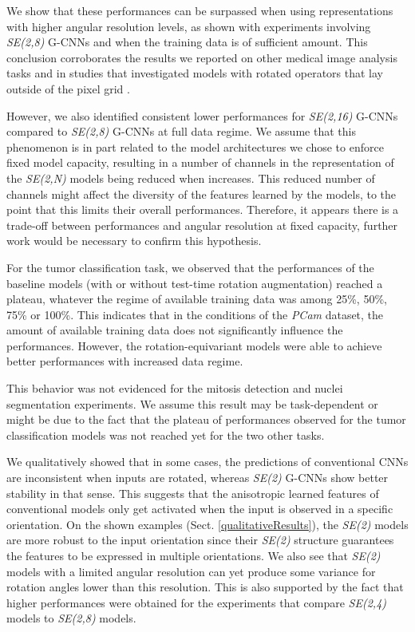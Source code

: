 \documentclass[twocolumn,final]{article}
\newcommand{\se}[1]{\textit{SE(#1)}}
\begin{document}
We show that these performances can be surpassed when using representations with higher angular resolution levels, as shown with experiments involving \se{2,8} G-CNNs and when the training data is of sufficient amount. This conclusion corroborates the results we reported on other medical image analysis tasks \citep{bekkers2018roto} and in studies that investigated models with rotated operators that lay outside of the pixel grid \citep{hoogeboom2018hexaconv}.

However, we also identified consistent lower performances for \se{2,16} G-CNNs compared to \se{2,8} G-CNNs at full data regime.
We assume that this phenomenon is in part related to the model architectures we chose to enforce fixed model capacity, resulting in a number of channels in the representation of the \se{2,N} models being reduced when  increases. This reduced number of channels might affect the diversity of the features learned by the models, to the point that this limits their overall performances.
Therefore, it appears there is a trade-off between performances and angular resolution at fixed capacity, further work would be necessary to confirm this hypothesis.

For the tumor classification task, we observed that the performances of the baseline models (with or without test-time rotation augmentation) reached a plateau, whatever the regime of available training data was among 25\%, 50\%, 75\% or 100\%.
This indicates that in the conditions of the \textit{PCam} dataset, the amount of available training data does not significantly influence the performances.
However, the rotation-equivariant models were able to achieve better performances with increased data regime.

This behavior was not evidenced for the mitosis detection and nuclei segmentation experiments.
We assume this result may be task-dependent or might be due to the fact that the plateau of performances observed for the tumor classification models was not reached yet for the two other tasks.

We qualitatively showed that in some cases, the predictions of conventional CNNs are inconsistent when inputs are rotated, whereas \se{2} G-CNNs show better stability in that sense.
This suggests that the anisotropic learned features of conventional models only get activated when the input is observed in a specific orientation.
On the shown examples (Sect. \ref{qualitativeResults}), the \se{2} models are more robust to the input orientation since their \se{2} structure guarantees the features to be expressed in multiple orientations.
We also see that \se{2} models with a limited angular resolution can yet produce some variance for rotation angles lower than this resolution.
This is also supported by the fact that higher performances were obtained for the experiments that compare \se{2,4} models to \se{2,8} models.
\end{document}
